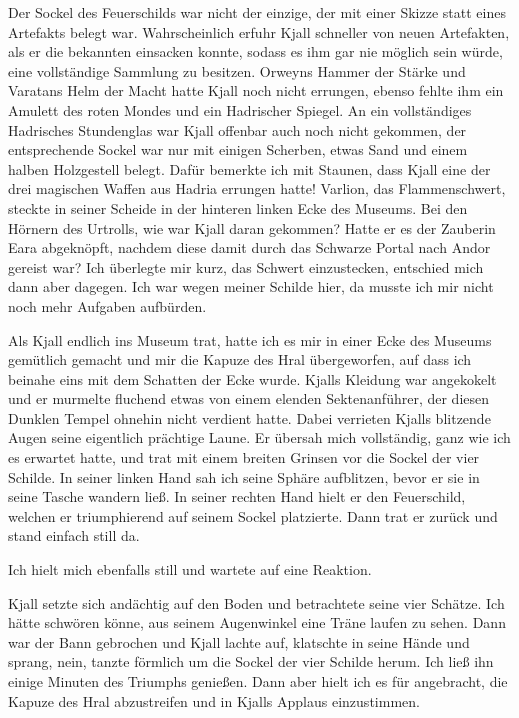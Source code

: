 Der Sockel des Feuerschilds war nicht der einzige, der mit einer Skizze statt eines Artefakts belegt war. Wahrscheinlich erfuhr Kjall schneller von neuen Artefakten, als er die bekannten einsacken konnte, sodass es ihm gar nie möglich sein würde, eine vollständige Sammlung zu besitzen. Orweyns Hammer der Stärke und Varatans Helm der Macht hatte Kjall noch nicht errungen, ebenso fehlte ihm ein Amulett des roten Mondes und ein Hadrischer Spiegel. An ein vollständiges Hadrisches Stundenglas war Kjall offenbar auch noch nicht gekommen, der entsprechende Sockel war nur mit einigen Scherben, etwas Sand und einem halben Holzgestell belegt. Dafür bemerkte ich mit Staunen, dass Kjall eine der drei magischen Waffen aus Hadria errungen hatte! Varlion, das Flammenschwert, steckte in seiner Scheide in der hinteren linken Ecke des Museums. Bei den Hörnern des Urtrolls, wie war Kjall daran gekommen? Hatte er es der Zauberin Eara abgeknöpft, nachdem diese damit durch das Schwarze Portal nach Andor gereist war? Ich überlegte mir kurz, das Schwert einzustecken, entschied mich dann aber dagegen. Ich war wegen meiner Schilde hier, da musste ich mir nicht noch mehr Aufgaben aufbürden.



\trennzeichen



Als Kjall endlich ins Museum trat, hatte ich es mir in einer Ecke des Museums gemütlich gemacht und mir die Kapuze des Hral übergeworfen, auf dass ich beinahe eins mit dem Schatten der Ecke wurde. Kjalls Kleidung war angekokelt und er murmelte fluchend etwas von einem elenden Sektenanführer, der diesen Dunklen Tempel ohnehin nicht verdient hatte. Dabei verrieten Kjalls blitzende Augen seine eigentlich prächtige Laune. Er übersah mich vollständig, ganz wie ich es erwartet hatte, und trat mit einem breiten Grinsen vor die Sockel der vier Schilde. In seiner linken Hand sah ich seine Sphäre aufblitzen, bevor er sie in seine Tasche wandern ließ. In seiner rechten Hand hielt er den Feuerschild, welchen er triumphierend auf seinem Sockel platzierte. Dann trat er zurück und stand einfach still da.

Ich hielt mich ebenfalls still und wartete auf eine Reaktion.

Kjall setzte sich andächtig auf den Boden und betrachtete seine vier Schätze. Ich hätte schwören könne, aus seinem Augenwinkel eine Träne laufen zu sehen. Dann war der Bann gebrochen und Kjall lachte auf, klatschte in seine Hände und sprang, nein, tanzte förmlich um die Sockel der vier Schilde herum. Ich ließ ihn einige Minuten des Triumphs genießen. Dann aber hielt ich es für angebracht, die Kapuze des Hral abzustreifen und in Kjalls Applaus einzustimmen.

